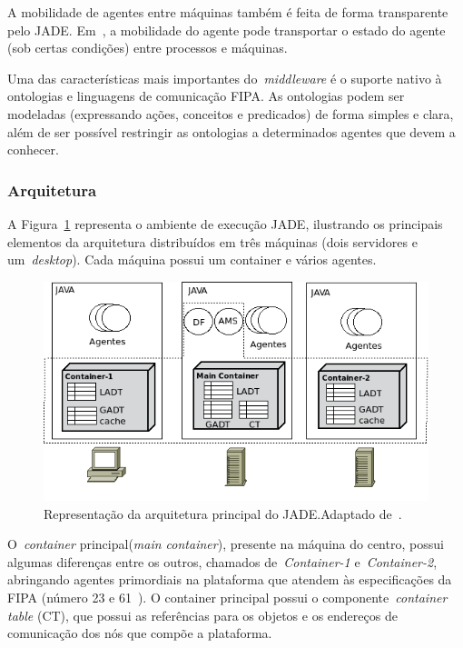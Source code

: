 A mobilidade de agentes entre máquinas também é feita de forma transparente pelo JADE. Em~\cite{bellifemine07}, a mobilidade do agente pode transportar o estado do agente (sob certas condições) entre processos e máquinas.

Uma das características mais importantes do~\emph{middleware} é o suporte nativo à ontologias e linguagens de comunicação FIPA. As ontologias podem ser modeladas (expressando ações, conceitos e predicados) de forma simples e clara, além de ser possível restringir as ontologias a determinados agentes que devem a conhecer.

\subsubsection{Arquitetura}

A Figura~\ref{fig:arquitetura-jade} representa o ambiente de execução JADE, ilustrando os principais elementos da arquitetura distribuídos em três máquinas (dois servidores e um~\emph{desktop}). Cada máquina possui um container e vários agentes.

\begin{figure}
	\centering
	\includegraphics[scale=0.65]{images/arquitetura-jade.png}
	\caption{Representação da arquitetura principal do JADE.Adaptado de~\cite{bellifemine07}.}
	\label{fig:arquitetura-jade}
\end{figure}

O~\emph{container} principal(\emph{main container}), presente na máquina do centro, possui algumas diferenças entre os outros, chamados de~\emph{Container-1} e~\emph{Container-2}, abringando agentes primordiais na plataforma que atendem às especificações da FIPA (número 23 e 61~\cite{bellifemineGuide02}). O container principal possui o componente~\emph{container table} (CT), que possui as referências para os objetos e os endereços de comunicação dos nós que compõe a plataforma.

